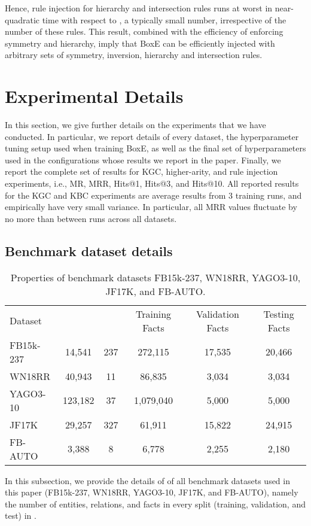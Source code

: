 \documentclass{article}
\begin{document}
Hence, rule injection for hierarchy and intersection rules runs at worst in near-quadratic time with respect to , a typically small number, irrespective of the number of these rules. This result, combined with the efficiency of enforcing symmetry and hierarchy, imply that BoxE can be efficiently injected with arbitrary sets of symmetry, inversion, hierarchy and intersection rules.

\section{Experimental Details}
In this section, we give further details on the experiments that we have conducted. In particular, we report details of every dataset, the hyperparameter tuning setup used when training BoxE, as well as the final set of hyperparameters used in the configurations whose results we report in the paper. Finally, we report the complete set of results for KGC, higher-arity, and rule injection experiments, i.e., MR, MRR, Hits@1, Hits@3, and Hits@10. All reported results for the KGC and KBC experiments are average results from 3 training runs, and empirically have very small variance. In particular, all MRR values fluctuate by no more than  between runs across all datasets. 

\label{app:exp}
\subsection{Benchmark dataset details}
\begin{table}[t!]
	\centering
	\caption{Properties of benchmark datasets FB15k-237, WN18RR, YAGO3-10, JF17K, and FB-AUTO.} 
	\begin{tabular}{lccccc}
		\toprule 
		 {Dataset} &  &  & Training Facts & Validation Facts & Testing Facts\\
		\cmidrule(r){2-6}
		 FB15k-237 & 14,541 & 237 & 272,115 & 17,535 & 20,466\\
		 WN18RR & 40,943 & 11 & 86,835 & 3,034 & 3,034 \\
		 YAGO3-10 & 123,182 & 37 & 1,079,040 & 5,000 & 5,000 \\
		 JF17K & 29,257 & 327 & 61,911 & 15,822 & 24,915 \\
		 FB-AUTO & 3,388 & 8 & 6,778 & 2,255 & 2,180 \\
		\bottomrule
	\end{tabular}
	\label{tab:DatasetDetails}
\end{table}

In this subsection, we provide the details of of all benchmark datasets used in this paper (FB15k-237, WN18RR, YAGO3-10, JF17K, and FB-AUTO), namely the number of entities, relations, and facts in every split (training, validation, and test) in .  
\end{document}
